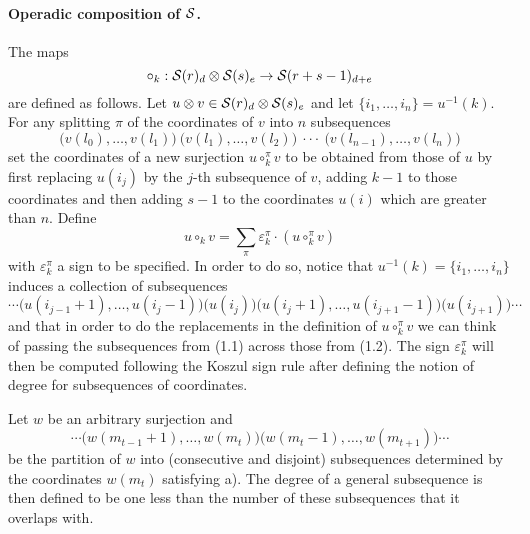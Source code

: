\documentclass[thesis.tex]{subfiles}
\begin{document}
\paragraph{Operadic composition of $\S$.} The maps $$\circ_k:\S(r)_d\tensor\S(s)_e\to\S(r+s-1)_{d+e}$$ are defined as follows. Let $u\tensor v\in\S(r)_d\tensor \S(s)_e$ and let $\{i_1,\dotsc,i_n\}=u^{-1}(k)$. For any splitting $\pi$ of the coordinates of $v$ into $n$ subsequences
\begin{equation}
\big(v(l_0),\dotsc,v(l_1)\big) \ \big(v(l_1),\dotsc,v(l_2)\big) \ \cdot\cdot\cdot \ \big(v(l_{n-1}),\dotsc,v(l_n)\big)
\end{equation}
set the coordinates of a new surjection $u\circ_k^{\pi}v$ to be obtained from those of $u$ by first replacing $u(i_j)$ by the $j$-th subsequence of $v$, adding $k-1$ to those coordinates and then adding $s-1$ to the coordinates $u(i)$ which are greater than $n$. Define $$u\circ_k v=\sum_{\pi}\varepsilon_k^\pi\cdot(u\circ_k^{\pi}v)$$ with $\varepsilon_k^\pi$ a sign to be specified. In order to do so, notice that $u^{-1}(k)=\{i_1,\dotsc,i_n\}$ induces a collection of subsequences
\begin{equation}
\cdots\big(u(i_{j-1}+1),\dotsc,u(i_{j}-1)\big)\big(u(i_j)\big)\big(u(i_j+1),\dotsc,u(i_{j+1}-1)\big)\big(u(i_{j+1})\big)\cdots
\end{equation} and that in order to do the replacements in the definition of $u\circ_k^{\pi}v$ we can think of passing the subsequences from (1.1) across those from (1.2). The sign $\varepsilon_k^\pi$ will then be computed following the Koszul sign rule after defining the notion of degree for subsequences of coordinates.

Let $w$ be an arbitrary surjection and $$\cdots\big(w(m_{t-1}+1),\dotsc,w(m_t)\big)\big(w(m_t-1),\dotsc,w(m_{t+1})\big)\cdots$$ be the partition of $w$ into (consecutive and disjoint) subsequences determined by the coordinates $w(m_t)$ satisfying a). The degree of a general subsequence is then defined to be one less than the number of these subsequences that it overlaps with.
\end{document}
